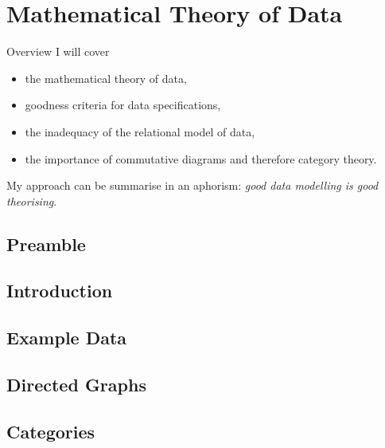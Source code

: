 \section{Mathematical Theory of Data}

\begin{frame}{Overview}
I will cover
\begin{itemize}
\item the mathematical theory of data,
\item goodness criteria for data specifications,
\item the inadequacy of the relational model of data,
\item the importance of commutative diagrams and therefore category theory.
\end{itemize}

\medskip
\pause
My approach can be summarise in an aphorism:
\textit{good data modelling is good theorising}.

\end{frame}

\iffalse
\subsection{Example}
\begin{frame}{Example -- LCMSMS Data}
\scalebox{0.2}{

}
\end{frame}
\fi

\subsection{Preamble}


\subsection{Introduction}


\subsection{Example Data}


\subsection{Directed Graphs}



\subsection{Categories}


